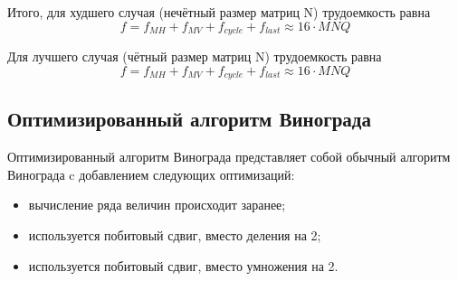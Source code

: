 Итого, для худшего случая (нечётный размер матриц N) трудоемкость равна
\begin{equation}
	\label{for:bad}
	f =  f_{MH} + f_{MV} + f_{cycle} + f_{last}\approx 16 \cdot MNQ
\end{equation}

Для лучшего случая (чётный размер матриц N) трудоемкость равна
\begin{equation}
	\label{for:good}
	f =  f_{MH} + f_{MV} + f_{cycle} + f_{last} \approx 16 \cdot MNQ
\end{equation}


\subsection{Оптимизированный алгоритм Винограда}

Оптимизированный алгоритм Винограда представляет собой обычный алгоритм Винограда c добавлением следующих оптимизаций:
\begin{itemize}
	\item вычисление ряда величин происходит заранее;
	\item используется побитовый сдвиг, вместо деления на 2;
	\item используется побитовый сдвиг, вместо умножения на 2.
\end{itemize}


